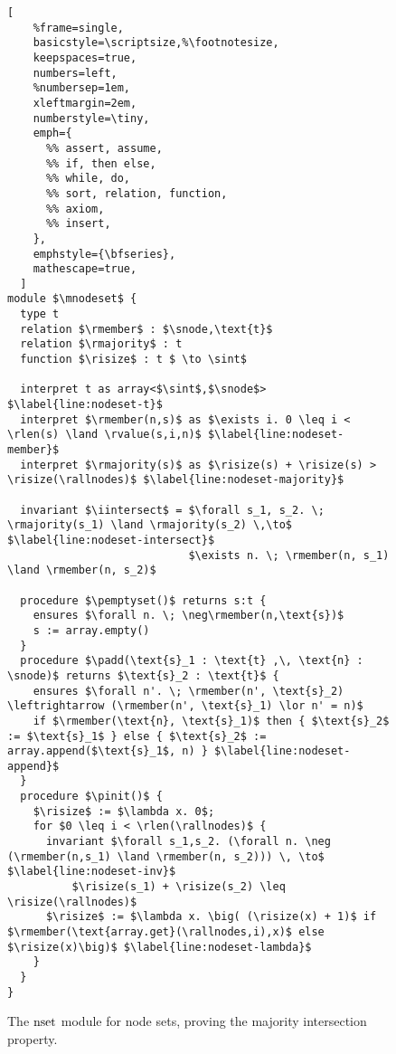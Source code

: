 \begin{figure}
\begin{lstlisting}[
    %frame=single,
    basicstyle=\scriptsize,%\footnotesize,
    keepspaces=true,
    numbers=left,
    %numbersep=1em,
    xleftmargin=2em,
    numberstyle=\tiny,
    emph={
      %% assert, assume,
      %% if, then else,
      %% while, do,
      %% sort, relation, function,
      %% axiom,
      %% insert,
    },
    emphstyle={\bfseries},
    mathescape=true,
  ]
module $\mnodeset$ {
  type t
  relation $\rmember$ : $\snode,\text{t}$
  relation $\rmajority$ : t
  function $\risize$ : t $ \to \sint$

  interpret t as array<$\sint$,$\snode$> $\label{line:nodeset-t}$
  interpret $\rmember(n,s)$ as $\exists i. 0 \leq i < \rlen(s) \land \rvalue(s,i,n)$ $\label{line:nodeset-member}$
  interpret $\rmajority(s)$ as $\risize(s) + \risize(s) > \risize(\rallnodes)$ $\label{line:nodeset-majority}$

  invariant $\iintersect$ = $\forall s_1, s_2. \; \rmajority(s_1) \land \rmajority(s_2) \,\to$ $\label{line:nodeset-intersect}$
                            $\exists n. \; \rmember(n, s_1) \land \rmember(n, s_2)$

  procedure $\pemptyset()$ returns s:t {
    ensures $\forall n. \; \neg\rmember(n,\text{s})$
    s := array.empty()
  }
  procedure $\padd(\text{s}_1 : \text{t} ,\, \text{n} : \snode)$ returns $\text{s}_2 : \text{t}$ {
    ensures $\forall n'. \; \rmember(n', \text{s}_2) \leftrightarrow (\rmember(n', \text{s}_1) \lor n' = n)$
    if $\rmember(\text{n}, \text{s}_1)$ then { $\text{s}_2$ := $\text{s}_1$ } else { $\text{s}_2$ := array.append($\text{s}_1$, n) } $\label{line:nodeset-append}$
  }
  procedure $\pinit()$ {
    $\risize$ := $\lambda x. 0$;
    for $0 \leq i < \rlen(\rallnodes)$ {
      invariant $\forall s_1,s_2. (\forall n. \neg (\rmember(n,s_1) \land \rmember(n, s_2))) \, \to$ $\label{line:nodeset-inv}$
          $\risize(s_1) + \risize(s_2) \leq \risize(\rallnodes)$
      $\risize$ := $\lambda x. \big( (\risize(x) + 1)$ if $\rmember(\text{array.get}(\rallnodes,i),x)$ else $\risize(x)\big)$ $\label{line:nodeset-lambda}$
    }
  }
}
\end{lstlisting}
\caption{\label{fig:nodeset}The ${\text{nset}}$ module for node sets, proving the majority intersection property.}
\end{figure}

